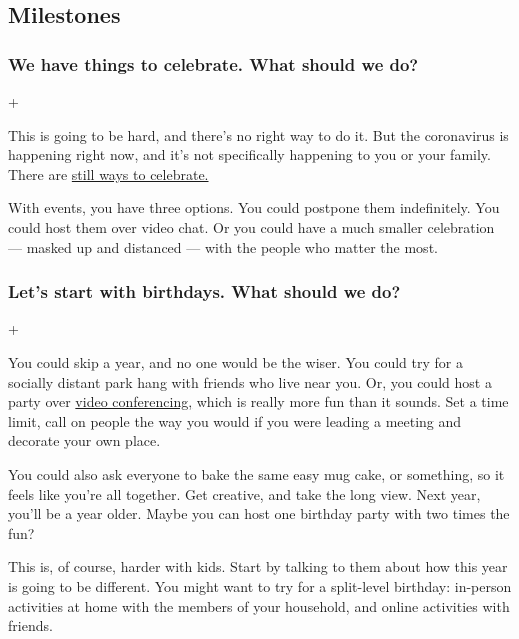 \hypertarget{milestones}{%
\subsection{Milestones}\label{milestones}}

\hypertarget{we-have-things-to-celebrate-what-should-we-do}{%
\subsubsection{We have things to celebrate. What should we
do?}\label{we-have-things-to-celebrate-what-should-we-do}}

+

This is going to be hard, and there's no right way to do it. But the
coronavirus is happening right now, and it's not specifically happening
to you or your family. There are
\href{https://www.nytimes3xbfgragh.onion/2020/04/15/style/self-care/birthday-party-coronavirus-online-zoom.html}{still
ways to celebrate.}

With events, you have three options. You could postpone them
indefinitely. You could host them over video chat. Or you could have a
much smaller celebration --- masked up and distanced --- with the people
who matter the most.

\hypertarget{lets-start-with-birthdays-what-should-we-do}{%
\subsubsection{Let's start with birthdays. What should we
do?}\label{lets-start-with-birthdays-what-should-we-do}}

+

You could skip a year, and no one would be the wiser. You could try for
a socially distant park hang with friends who live near you. Or, you
could host a party over
\href{https://www.nytimes3xbfgragh.onion/2020/04/02/us/coronavirus-birthday-party.html}{video
conferencing,} which is really more fun than it sounds. Set a time
limit, call on people the way you would if you were leading a meeting
and decorate your own place.

You could also ask everyone to bake the same easy mug cake, or
something, so it feels like you're all together. Get creative, and take
the long view. Next year, you'll be a year older. Maybe you can host one
birthday party with two times the fun?

This is, of course, harder with kids. Start by talking to them about how
this year is going to be different. You might want to try for a
split-level birthday: in-person activities at home with the members of
your household, and online activities with friends.

